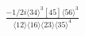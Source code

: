\documentclass[varwidth, border=5pt]{standalone}
\begin{document}
\begin{my}
$\begin{gathered}
\scriptscriptstyle\frac{-1/2i\langle34\rangle^3[45]\langle56\rangle^3}{\langle12\rangle\langle16\rangle\langle23\rangle\langle35\rangle^4}
\end{gathered}$
\end{my}
\end{document}
